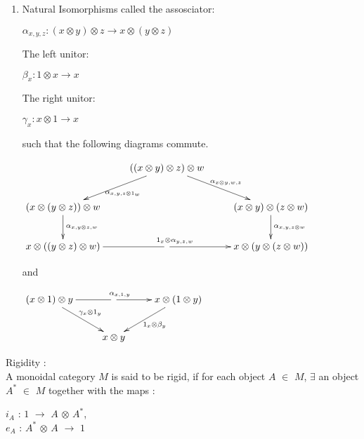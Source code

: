 \begin{defn}
\begin{enumerate}
\item Natural Isomorphisms called the assosciator:\\
                     \begin{center}
                       $\alpha_{x,y,z} : (x \otimes y) \otimes z \longrightarrow x \otimes (y \otimes z)$
                     \end{center}
         The left unitor:
                     \begin{center}
		      $\beta_{x} : 1 \otimes x \longrightarrow x$
		    \end{center}
         The right unitor:
		    \begin{center}
		     $\gamma_{x} : x \otimes 1 \longrightarrow x$
		    \end{center}
         such that the following diagrams commute. 
                    \begin{center} 
                    $\xymatrix { 
		     &((x \otimes y) \otimes z) \otimes w \ar[dr]^{\alpha_{x \otimes y, w, z}}  \ar[dl]^{\alpha_{x,y,z \otimes 1_{w}}}\\ 
		     (x \otimes (y \otimes z)) \otimes w \ar[d]^{\alpha_{x,y \otimes z, w}}        &          & (x \otimes y) \otimes (z \otimes w) \ar[d]^{\alpha_{x,y,z \otimes w}} \\
		     x \otimes (( y \otimes z) \otimes w) \ar@{-}[r]  &\ar[r]^<(0.05){1_{x} \otimes \alpha_{y,z,w}}   & x \otimes (y \otimes ( z \otimes w))
                    }$  
                       \end{center}
          and 
		    \begin{center}
		    $\xymatrix {
		    (x \otimes 1) \otimes y \ar[dr]^{\gamma_{x} \otimes 1_{y}} \ar@{-}[r] & \ar[r]^<(0.05){\alpha_{x,1,y}}   & x \otimes (1 \otimes y) \ar[dl]^{1_{x} \otimes \beta_{y}}\\
		                                         & x \otimes y     
		    }$
		    \end{center}

\end{enumerate}
\end{defn}

\begin{defn}
Rigidity :\\
      A monoidal category $M$ is said to be rigid, if for each object $A$ $\in$ $M$, $\exists$ an object $A^{*}$ $\in$ $M$ together with the maps : 
      \begin{center}
      $i_{A}$ : $1$ $\rightarrow$ $A$ $\otimes$ $A^{*}$,  \\
      $e_{A}$ : $A^{*}$ $\otimes$ $A$ $\rightarrow$ $1$
      \end{center}
\end{defn}

